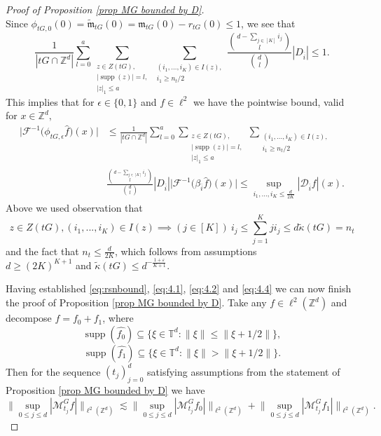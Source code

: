 \documentclass[a4paper,oneside, reqno]{amsart}
\numberwithin{equation}{section}
\theoremstyle{definition}%
\theoremstyle{definition}
\theoremstyle{definition}%
\theoremstyle{definition}
\newcommand{\Z}{\mathbb{Z}}
\newcommand{\T}{\mathbb{T}}
\DeclareMathOperator{\supp}{supp}
\begin{document}
\begin{proof}[Proof of Proposition \ref{prop MG bounded by D}]
\[\]
Since $\phi_{tG,0}(0)=\widetilde{\mathfrak{m}}_{tG}(0)=\mathfrak{m}_{tG}(0)-r_{tG}(0) \leq 1$, we see that
\begin{equation*} 
\frac{1}{|tG \cap \Z^d|} \sum_{l=0}^a \sum_{\substack{z \in Z(tG),
\\ |\supp(z)|=l, \\ |z|_1 \le a
}}  
\sum_{\substack{(i_1,\ldots, i_K) \in I(z), \\ 
i_1 \geq n_t/2
}} 
\frac{\binom{d-\sum_{j \in[K]}i_j}{l}}{\binom{d}{l}} |D_{\overline{i}}| \leq 1.
\end{equation*}
This implies that for $\epsilon \in \{0,1\}$ and $f\in \ell^2$ we have the pointwise bound, valid for $x\in \Z^d,$
\begin{equation}
\label{eq:4.4}
\begin{split}
\Big|\mathcal{F}^{-1} \Big( \phi_{tG,\epsilon}\widehat{f} \Big)(x)\Big| &\leq \frac{1}{|tG \cap \Z^d|} \sum_{l=0}^a \sum_{\substack{z \in Z(tG),
\\ |\supp(z)|=l, \\ |z|_1 \le a
}}  
\sum_{\substack{(i_1,\ldots, i_K) \in I(z), \\ 
i_1 \geq n_t/2
}} 
\\
&\frac{\binom{d-\sum_{j \in[K]}i_j}{l}}{\binom{d}{l}} |D_{\overline{i}}| \Big|\mathcal{F}^{-1} \Big( \beta_{\overline{i}}\widehat{f} \Big)(x)\Big|
\leq \sup_{i_1,...,i_K \leq \frac{d}{2K}} |\mathcal{D}_{\overline{i}}f|(x).
\end{split}
\end{equation}
Above we used observation that
\[
z \in Z(tG), (i_1,...,i_K) \in I(z) \implies (j \in [K]) \ i_j \le \sum_{j=1}^K ji_j \le d \widetilde{\kappa}(tG)=n_t
\]
and the fact that $n_t \leq \frac{d}{2K}$, which follows from assumptions \\ $d \geq (2K)^{K+1}$ and $\widetilde{\kappa}(tG) \leq d^{-\frac{1+\varepsilon}{K+1}}$. 


Having established \eqref{eq:rsnbound}, \eqref{eq:4.1}, \eqref{eq:4.2} and \eqref{eq:4.4} we can now finish the proof of Proposition \ref{prop MG bounded by D}. Take any $f \in \ell^2(\Z^d)$ and decompose $f=f_0+f_1$, where
\[
\supp(\widehat{f_0}) \subseteq \{\xi \in \T^d: \|\xi \| \leq \| \xi + 1/2 \| \},
\]
\[
\supp(\widehat{f_1}) \subseteq \{\xi \in \T^d: \|\xi \| > \| \xi + 1/2 \| \}.
\]
Then for the sequence $(t_j)_{j=0}^d$ satisfying assumptions from the statement of Proposition \ref{prop MG bounded by D} we have
\begin{equation}
\label{eq:sf0f1}
\Big\|\sup_{0 \le j \le d} |\mathcal{M}_{t_j}^Gf| \Big\|_{\ell^2(\Z^d)}\lesssim \Big\|\sup_{0 \le j \le d} |\mathcal{M}_{t_j}^Gf_0| \Big\|_{\ell^2(\Z^d)}  +\Big\|\sup_{0 \le j \le d} |\mathcal{M}_{t_j}^Gf_1| \Big\|_{\ell^2(\Z^d)}. 
\end{equation}


\end{proof}
\end{document}
